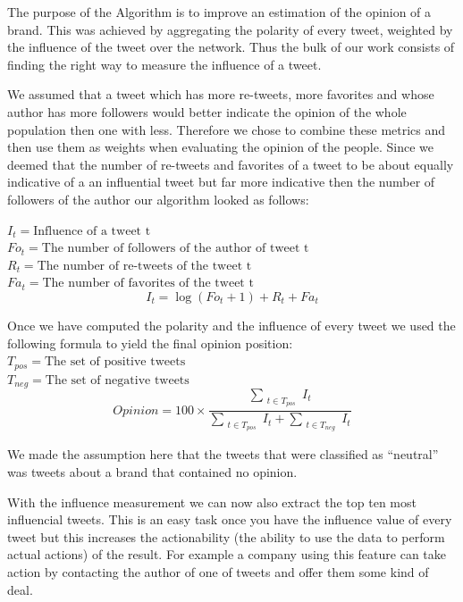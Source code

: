 \documentclass[a4paper,12pt]{report}
\begin{document}
The purpose of the Algorithm is to improve an estimation of the opinion of a brand. 
This was achieved by aggregating the polarity of every tweet, weighted by the influence of the tweet over the network.
Thus the bulk of our work consists of finding the right way to measure the influence of a tweet.

We assumed that a tweet which has more re-tweets, more favorites and whose author has more followers would better indicate the opinion of the whole population then one with less. Therefore we chose to combine these metrics and then use them as weights when evaluating the opinion of the people. Since we deemed that the number of re-tweets and favorites of a tweet to be about equally indicative of a an influential tweet but far more indicative then the number of followers of the author our algorithm looked as follows:

$I_t = \text{Influence of a tweet t}$\\
$Fo_t = \text{The number of followers of the author of tweet t}$\\
$R_t = \text{The number of re-tweets of the tweet t}$\\
$Fa_t = \text{The number of favorites of the tweet t}$\\
\begin{equation}
I_t = \log (Fo_t + 1) + R_t + Fa_t
\end{equation}

Once we have computed the polarity and the influence of every tweet we used the following formula to yield the final opinion position:\\
$T_{pos} = \text{The set of positive tweets}$\\
$T_{neg} = \text{The set of negative tweets}$\\
\begin{equation}
Opinion = 100 \times \frac{\sum_{\substack{t \in T_{pos}}} I_t}{\sum_{\substack{t \in T_{pos}}} I_t + \sum_{\substack{t \in T_{neg}}} I_t}
\end{equation}

We made the assumption here that the tweets that were classified as ``neutral'' was tweets about a brand that contained no opinion.

With the influence measurement we can now also extract the top ten most influencial tweets. This is an easy task once you have the influence value of every tweet but this increases the actionability (the ability to use the data to perform actual actions) of the result. For example a company using this feature can take action by contacting the author of one of tweets and offer them some kind of deal.
\end{document}
